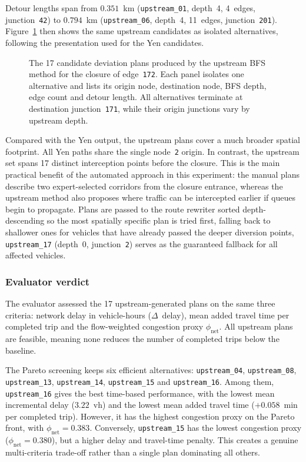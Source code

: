 Detour lengths span from $0.351$~km (\texttt{upstream\_01}, depth~4,
4~edges, junction~\texttt{42}) to $0.794$~km (\texttt{upstream\_06},
depth~4, 11~edges, junction~\texttt{201}).
Figure~\ref{fig:results_upstream_alternative_grid}
then shows the same upstream candidates as isolated alternatives, following
the presentation used for the Yen candidates.

\begin{figure}[H]
  \centering
  \caption{The 17 candidate deviation plans produced by the upstream BFS
  method for the closure of edge~\texttt{172}. Each panel isolates one
  alternative and lists its origin node, destination node, BFS depth, edge
  count and detour length. All alternatives terminate at destination
  junction~\texttt{171}, while their origin junctions vary by upstream depth.}
  \label{fig:results_upstream_alternative_grid}
\end{figure}

Compared with the Yen output, the upstream plans cover a much broader
spatial footprint. All Yen paths share the single node~\texttt{2} origin. In
contrast, the upstream set spans 17 distinct interception points before the
closure. This is
the main practical benefit of the automated approach in this experiment: the
manual plans describe two expert-selected corridors from the closure entrance,
whereas the upstream method also proposes where traffic can be intercepted
earlier if queues begin to propagate. Plans are passed to the route rewriter
sorted depth-descending so the most spatially specific plan is tried first,
falling back to shallower ones for vehicles that have already passed the
deeper diversion points, \texttt{upstream\_17} (depth~0, junction~\texttt{2})
serves as the guaranteed fallback for all affected vehicles.

\subsubsection{Evaluator verdict}
The evaluator assessed the 17 upstream-generated plans on the same three
criteria: network delay in vehicle-hours ($\Delta$~delay), mean added travel
time per completed trip and the flow-weighted congestion proxy
$\phi_\text{net}$. All upstream plans are feasible, meaning none reduces the
number of completed trips below the baseline.

The Pareto screening keeps six efficient alternatives:
\texttt{upstream\_04}, \texttt{upstream\_08}, \texttt{upstream\_13},
\texttt{upstream\_14}, \texttt{upstream\_15} and
\texttt{upstream\_16}. Among them, \texttt{upstream\_16} gives the best
time-based performance, with the lowest mean incremental delay
($3.22$~vh) and the lowest mean added travel time
($+0.058$~min per completed trip). However, it has the highest congestion
proxy on the Pareto front, with $\phi_\text{net}=0.383$. Conversely,
\texttt{upstream\_15} has the lowest congestion proxy
($\phi_\text{net}=0.380$), but a higher delay and travel-time penalty.
This creates a genuine multi-criteria trade-off rather than a single plan
dominating all others.

